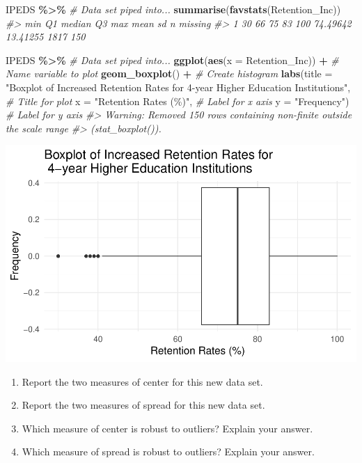 \documentclass[
]{report}
\newenvironment{Shaded}{\begin{snugshade}}{\end{snugshade}}
\newcommand{\AttributeTok}[1]{\textcolor[rgb]{0.13,0.29,0.53}{#1}}
\newcommand{\CommentTok}[1]{\textcolor[rgb]{0.56,0.35,0.01}{\textit{#1}}}
\newcommand{\FunctionTok}[1]{\textcolor[rgb]{0.13,0.29,0.53}{\textbf{#1}}}
\newcommand{\NormalTok}[1]{#1}
\newcommand{\SpecialCharTok}[1]{\textcolor[rgb]{0.81,0.36,0.00}{\textbf{#1}}}
\newcommand{\StringTok}[1]{\textcolor[rgb]{0.31,0.60,0.02}{#1}}
\begin{document}
\begin{Shaded}
\begin{Highlighting}[]
\NormalTok{IPEDS }\SpecialCharTok{\%\textgreater{}\%} \CommentTok{\# Data set piped into...}
    \FunctionTok{summarise}\NormalTok{(}\FunctionTok{favstats}\NormalTok{(Retention\_Inc))}
\CommentTok{\#\textgreater{}   min Q1 median Q3 max     mean       sd    n missing}
\CommentTok{\#\textgreater{} 1  30 66     75 83 100 74.49642 13.41255 1817     150}

\NormalTok{IPEDS }\SpecialCharTok{\%\textgreater{}\%} \CommentTok{\# Data set piped into...}
    \FunctionTok{ggplot}\NormalTok{(}\FunctionTok{aes}\NormalTok{(}\AttributeTok{x =}\NormalTok{ Retention\_Inc)) }\SpecialCharTok{+} \CommentTok{\# Name variable to plot}
    \FunctionTok{geom\_boxplot}\NormalTok{() }\SpecialCharTok{+} \CommentTok{\# Create histogram }
\FunctionTok{labs}\NormalTok{(}\AttributeTok{title =} \StringTok{"Boxplot of Increased Retention Rates for 4{-}year Higher Education Institutions"}\NormalTok{, }\CommentTok{\# Title for plot}
\AttributeTok{x =} \StringTok{"Retention Rates (\%)"}\NormalTok{, }\CommentTok{\# Label for x axis}
\AttributeTok{y =} \StringTok{"Frequency"}\NormalTok{) }\CommentTok{\# Label for y axis}
\CommentTok{\#\textgreater{} Warning: Removed 150 rows containing non{-}finite outside the scale range}
\CommentTok{\#\textgreater{} (\textasciigrave{}stat\_boxplot()\textasciigrave{}).}
\end{Highlighting}
\end{Shaded}

\begin{center}\includegraphics[width=0.7\linewidth]{06-A11-EDA-quantitative_files/figure-latex/unnamed-chunk-5-1} \end{center}

\begin{enumerate}
\def\labelenumi{\arabic{enumi}.}
\setcounter{enumi}{12}
\item
  Report the two measures of center for this new data set.
  \vspace{0.5in}
\item
  Report the two measures of spread for this new data set.
  \vspace{0.5in}
\item
  Which measure of center is robust to outliers? Explain your answer.
  \vspace{0.8in}
\item
  Which measure of spread is robust to outliers? Explain your answer.
  \vspace{0.8in}
\end{enumerate}
\end{document}
